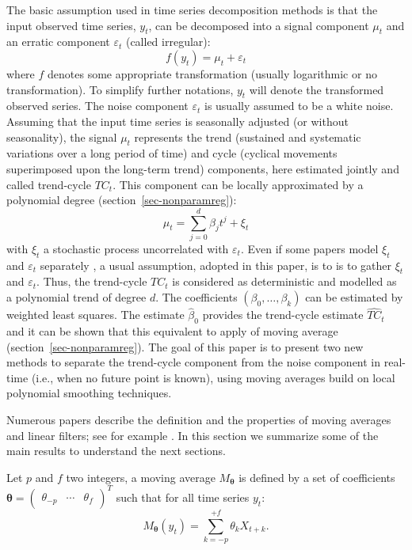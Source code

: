 \documentclass[
]{article}
\newcommand\transp[1]{{#1}^T}
\newcommand\1{\mathds{1}}
\begin{document}
The basic assumption used in time series decomposition methods is that
the input observed time series, \(y_t\), can be decomposed into a signal
component \(\mu_t\) and an erratic component \(\varepsilon_t\) (called
irregular): \[
f(y_t)=\mu_t+\varepsilon_t
\] where \(f\) denotes some appropriate transformation (usually
logarithmic or no transformation). To simplify further notations,
\(y_t\) will denote the transformed observed series. The noise component
\(\varepsilon_t\) is usually assumed to be a white noise. Assuming that
the input time series is seasonally adjusted (or without seasonality),
the signal \(\mu_t\) represents the trend (sustained and systematic
variations over a long period of time) and cycle (cyclical movements
superimposed upon the long-term trend) components, here estimated
jointly and called trend-cycle \(TC_t\). This component can be locally
approximated by a polynomial degree (section~\ref{sec-nonparamreg}): \[
\mu_t = \sum_{j=0}^d\beta_jt^j+\xi_t
\] with \(\xi_t\) a stochastic process uncorrelated with
\(\varepsilon_t\). Even if some papers model \(\xi_t\) and
\(\varepsilon_t\) separately \autocite[see for
example][]{GrayThomson2002}, a usual assumption, adopted in this paper,
is to is to gather \(\xi_t\) and \(\varepsilon_t\). Thus, the
trend-cycle \(TC_t\) is considered as deterministic and modelled as a
polynomial trend of degree \(d\). The coefficients
\((\beta_0,\dots,\beta_k)\) can be estimated by weighted least squares.
The estimate \(\hat \beta_0\) provides the trend-cycle estimate
\(\widehat{TC}_t\) and it can be shown that this equivalent to apply of
moving average (section~\ref{sec-nonparamreg}). The goal of this paper
is to present two new methods to separate the trend-cycle component from
the noise component in real-time (i.e., when no future point is known),
using moving averages build on local polynomial smoothing techniques.

Numerous papers describe the definition and the properties of moving
averages and linear filters; see for example \textcite{ch12HBSA}. In
this section we summarize some of the main results to understand the
next sections.

Let \(p\) and \(f\) two integers, a moving average
\(M_{\boldsymbol\theta}\) is defined by a set of coefficients
\(\boldsymbol\theta=\transp{\begin{pmatrix}\theta_{-p}&\cdots&\theta_{f}\end{pmatrix}}\)
such that for all time series \(y_t\): \[
M_{\boldsymbol\theta}(y_t)=\sum_{k=-p}^{+f}\theta_kX_{t+k}.
\]
\end{document}
